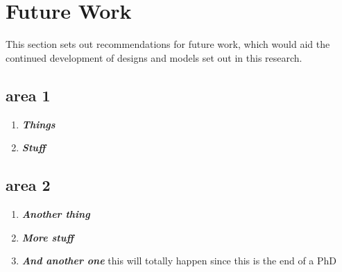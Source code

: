 \section{Future Work}
 This section sets out recommendations for future work, which would aid the continued development of designs and models set out in this research.

\subsection{area 1}
\begin{enumerate}
	\item \textbf{\textit{Things }} 
	
	\item \textbf{\textit{Stuff}} 

\end{enumerate}


\subsection{area 2}
\begin{enumerate}
	\item \textbf{\textit{Another thing}} 
	
	\item \textbf{\textit{More stuff}} 

	
 	\item \textbf{\textit{And another one}} this will totally happen since this is the end of a PhD
 	
 \end{enumerate}
